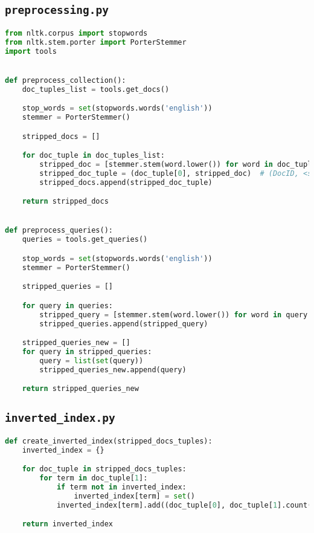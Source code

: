 \subsection{\texttt{preprocessing.py}}
\begin{lstlisting}[language=Python]
from nltk.corpus import stopwords
from nltk.stem.porter import PorterStemmer
import tools


def preprocess_collection():
    doc_tuples_list = tools.get_docs()

    stop_words = set(stopwords.words('english'))
    stemmer = PorterStemmer()

    stripped_docs = []

    for doc_tuple in doc_tuples_list:
        stripped_doc = [stemmer.stem(word.lower()) for word in doc_tuple[1] if word.lower() not in stop_words]
        stripped_doc_tuple = (doc_tuple[0], stripped_doc)  # (DocID, <stripped_doc>)
        stripped_docs.append(stripped_doc_tuple)

    return stripped_docs


def preprocess_queries():
    queries = tools.get_queries()

    stop_words = set(stopwords.words('english'))
    stemmer = PorterStemmer()

    stripped_queries = []

    for query in queries:
        stripped_query = [stemmer.stem(word.lower()) for word in query.split() if word.lower() not in stop_words]
        stripped_queries.append(stripped_query)

    stripped_queries_new = []
    for query in stripped_queries:
        query = list(set(query))
        stripped_queries_new.append(query)

    return stripped_queries_new
\end{lstlisting}


\subsection{\texttt{inverted\_index.py}}
\begin{lstlisting}[language=Python]
def create_inverted_index(stripped_docs_tuples):
    inverted_index = {}

    for doc_tuple in stripped_docs_tuples:
        for term in doc_tuple[1]:
            if term not in inverted_index:
                inverted_index[term] = set()
            inverted_index[term].add((doc_tuple[0], doc_tuple[1].count(term)))

    return inverted_index
\end{lstlisting}


